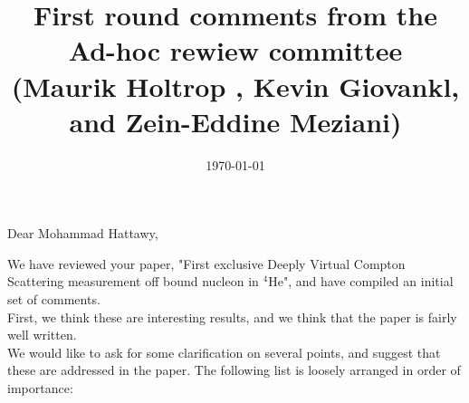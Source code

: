 \documentclass[a4paper,11pt,twoside]{article}
\title{First round comments from the Ad-hoc rewiew committee \\
 (Maurik Holtrop , Kevin Giovankl, and Zein-Eddine Meziani)}
\date{\today}
\begin{document}
\maketitle

\section*{}

Dear Mohammad Hattawy,

We have reviewed your paper, "First exclusive Deeply Virtual Compton Scattering measurement off bound nucleon in $^4$He", and have compiled an initial set of comments.\\

First, we think these are interesting results, and we think that the paper is fairly well written.\\ 

We would like to ask for some clarification on several points, and suggest that these are addressed in the paper. The following list is loosely arranged in order of importance: \\
\end{document}
